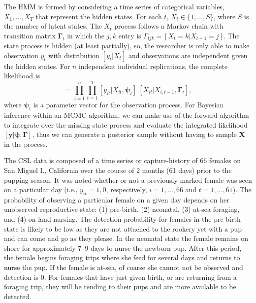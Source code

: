 \documentclass[12pt,english]{article}
\begin{document}
\begin{spacing}{1.9}
    The HMM is formed by considering a time series of categorical variables, $X_{1}, \dots, X_{T}$ that represent the hidden states. For each $t$, $X_{t} \in \{1, \dots, S\}$, where $S$ is the number of latent states. The $X_t$ process follows a Markov chain with transition matrix $\boldsymbol{\Gamma}_t$ in which the $j,k$ entry is $\Gamma_{tjk} = [X_t = k | X_{t-1} = j]$. The state process is hidden (at least partially), so, the researcher is only able to make observation $y_t$ with distribution $[y_t|X_t]$ and observations are independent given the hidden states. For $n$ independent individual replications, the complete likelihood is
    \begin{equation}
    [\mathbf{y}, \mathbf{X}| \boldsymbol{\psi}, \boldsymbol{\Gamma}] = \prod_{i=1}^n\prod_{t=1}^T [y_{it}|X_{it}, \boldsymbol{\psi}_t]\ [X_{it}|X_{i,t-1},\boldsymbol{\Gamma}_t],
    \end{equation}
 where $\boldsymbol{\psi}_t$ is a parameter vector for the observation process. For Bayesian inference within an MCMC algorithm, we can make use of the forward algorithm \citep[see][]{zucchini2009hidden} to integrate over the missing state process and evaluate the integrated likelihood $[\mathbf{y}|\boldsymbol{\psi}, \boldsymbol{\Gamma}]$, thus we can generate a posterior sample without having to sample $\boldsymbol{X}$ in the process.
 
 The CSL data is composed of a time series or capture-history of 66 females on San Miguel I., California over the course of 2 months (61 days) prior to the pupping season. It was noted whether or not a previously marked female was seen on a particular day (i.e., $y_{it} =1,0$, respectively, $i=1,\dots,66$ and $t=1,\dots,61$). The probability of observing a particular female on a given day depends on her unobserved reproductive state: (1) pre-birth, (2) neonatal, (3) at-sea foraging, and (4) on-land nursing. The detection probability for females in the pre-birth state is likely to be low as they are not attached to the rookery yet with a pup and can come and go as they please. In the neonatal state the female remains on shore for approximately 7--9 days to nurse the newborn pup. After this period, the female begins foraging trips where she feed for several days and returns to nurse the pup. If the female is at-sea, of coarse she cannot not be observed and detection is 0. For females that have just given birth, or are returning from a foraging trip, they will be tending to their pups and are more available to be detected. 
 

\end{spacing}
\end{document}
